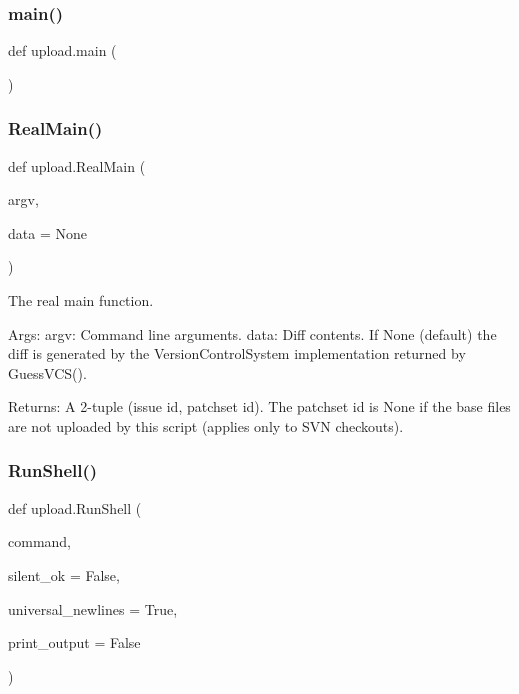 \subsubsection{\texorpdfstring{main()}{main()}}
{\footnotesize\ttfamily def upload.\+main (\begin{DoxyParamCaption}{ }\end{DoxyParamCaption})}

\mbox{\label{namespaceupload_ad6226af96c9f1905602b8002bd5de952}} 
\subsubsection{\texorpdfstring{Real\+Main()}{RealMain()}}
{\footnotesize\ttfamily def upload.\+Real\+Main (\begin{DoxyParamCaption}\item[{}]{argv,  }\item[{}]{data = {\ttfamily None} }\end{DoxyParamCaption})}

\begin{DoxyVerb}The real main function.

Args:
  argv: Command line arguments.
  data: Diff contents. If None (default) the diff is generated by
    the VersionControlSystem implementation returned by GuessVCS().

Returns:
  A 2-tuple (issue id, patchset id).
  The patchset id is None if the base files are not uploaded by this
  script (applies only to SVN checkouts).
\end{DoxyVerb}
 \mbox{\label{namespaceupload_adddc423c49132e8879cbb25d6be2cf11}} 
\subsubsection{\texorpdfstring{Run\+Shell()}{RunShell()}}
{\footnotesize\ttfamily def upload.\+Run\+Shell (\begin{DoxyParamCaption}\item[{}]{command,  }\item[{}]{silent\+\_\+ok = {\ttfamily False},  }\item[{}]{universal\+\_\+newlines = {\ttfamily True},  }\item[{}]{print\+\_\+output = {\ttfamily False} }\end{DoxyParamCaption})}

